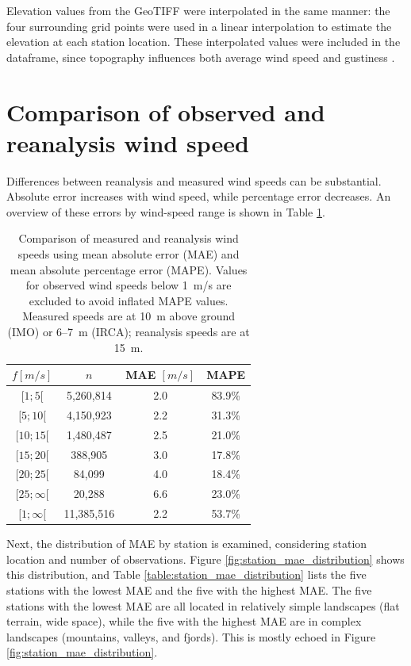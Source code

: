 Elevation values from the GeoTIFF were interpolated in the same manner: the four surrounding grid points were used in a linear interpolation to estimate the elevation at each station location. These interpolated values were included in the dataframe, since topography influences both average wind speed and gustiness \parencite{GNP_vidtal}.

\section{Comparison of observed and reanalysis wind speed}

Differences between reanalysis and measured wind speeds can be substantial. Absolute error increases with wind speed, while percentage error decreases. An overview of these errors by wind-speed range is shown in Table \ref{table:measuredVSReanalysis_wind_speed}.

\begin{table}[h]
  \centering
  \caption[Measured vs.\ reanalysis wind-speed errors]{Comparison of measured and reanalysis wind speeds using mean absolute error (MAE) and mean absolute percentage error (MAPE). Values for observed wind speeds below 1~m/s are excluded to avoid inflated MAPE values. Measured speeds are at 10~m above ground (IMO) or 6–7~m (IRCA); reanalysis speeds are at 15~m.}
  \label{table:measuredVSReanalysis_wind_speed}
  \begin{tabular}{cccc}
    \toprule
    $f[m/s]$ & $n$ & MAE $[m/s]$ & MAPE \\
    \midrule
    $[1; 5[$     & 5,260,814  & 2.0 & 83.9\% \\
    $[5; 10[$    & 4,150,923  & 2.2 & 31.3\% \\
    $[10; 15[$   & 1,480,487  & 2.5 & 21.0\% \\
    $[15; 20[$   &   388,905  & 3.0 & 17.8\% \\
    $[20; 25[$   &    84,099  & 4.0 & 18.4\% \\
    $[25; \infty[$ &   20,288 & 6.6 & 23.0\% \\
    $[1; \infty[$  &11,385,516 & 2.2 & 53.7\% \\
    \bottomrule
  \end{tabular}
\end{table}

Next, the distribution of MAE by station is examined, considering station location and number of observations. Figure \ref{fig:station_mae_distribution} shows this distribution, and Table \ref{table:station_mae_distribution} lists the five stations with the lowest MAE and the five with the highest MAE. The five stations with the lowest MAE are all located in relatively simple landscapes (flat terrain, wide space), while the five with the highest MAE are in complex landscapes (mountains, valleys, and fjords). This is mostly echoed in Figure \ref{fig:station_mae_distribution}.

